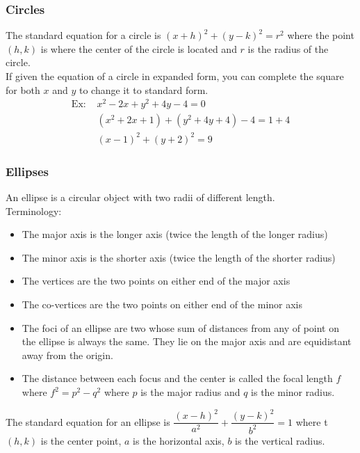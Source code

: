 \documentclass[11pt, fleqn]{article}
\begin{document}
\subsubsection{Circles}
The standard equation for a circle is $(x+h)^2+(y-k)^2=r^2$ where the point $(h,k)$ is where the center of the circle is located and $r$ is the radius of the circle.\\
If given the equation of a circle in expanded form, you can complete the square for both $x$ and $y$ to change it to standard form.\\
\begin{align*}
    \text{Ex: } &x^2-2x+y^2+4y-4=0\\
    &(x^2+2x+1)+(y^2+4y+4)-4=1+4\\
    &(x-1)^2+(y+2)^2=9
\end{align*}

\subsubsection{Ellipses}
An ellipse is a circular object with two radii of different length.\\
Terminology:
\begin{itemize}
    \item The major axis is the longer axis (twice the length of the longer radius)
    \item The minor axis is the shorter axis (twice the length of the shorter radius)
    \item The vertices are the two points on either end of the major axis
    \item The co-vertices are the two points on either end of the minor axis
    \item The foci of an ellipse are two whose sum of distances from any of point on the ellipse is always the same. They lie on the major axis and are equidistant away from the origin.
    \item The distance between each focus and the center is called the focal length $f$ where $f^2=p^2-q^2$ where $p$ is the major radius and $q$ is the minor radius.
\end{itemize}
The standard equation for an ellipse is $\dfrac{(x-h)^2}{a^2}+\dfrac{(y-k)^2}{b^2}=1$ where t $(h,k)$ is the center point, $a$ is the horizontal axis, $b$ is the vertical radius.
\end{document}
